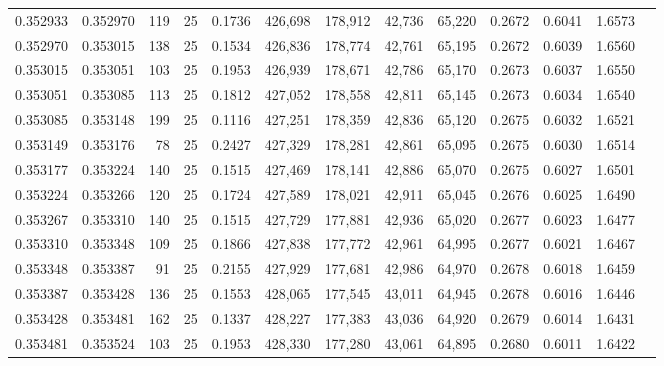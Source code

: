\begin{tabular}{rrrrrrrrrrrrr}
0.352933 & 0.352970 &   119 &  25 &                                     0.1736 & 426,698 & 178,912 &  42,736 &  65,220 & 0.2672 & 0.6041 & 1.6573 \\
0.352970 & 0.353015 &   138 &  25 &                                     0.1534 & 426,836 & 178,774 &  42,761 &  65,195 & 0.2672 & 0.6039 & 1.6560 \\
0.353015 & 0.353051 &   103 &  25 &                                     0.1953 & 426,939 & 178,671 &  42,786 &  65,170 & 0.2673 & 0.6037 & 1.6550 \\
0.353051 & 0.353085 &   113 &  25 &                                     0.1812 & 427,052 & 178,558 &  42,811 &  65,145 & 0.2673 & 0.6034 & 1.6540 \\
0.353085 & 0.353148 &   199 &  25 &                                     0.1116 & 427,251 & 178,359 &  42,836 &  65,120 & 0.2675 & 0.6032 & 1.6521 \\
0.353149 & 0.353176 &    78 &  25 &                                     0.2427 & 427,329 & 178,281 &  42,861 &  65,095 & 0.2675 & 0.6030 & 1.6514 \\
0.353177 & 0.353224 &   140 &  25 &                                     0.1515 & 427,469 & 178,141 &  42,886 &  65,070 & 0.2675 & 0.6027 & 1.6501 \\
0.353224 & 0.353266 &   120 &  25 &                                     0.1724 & 427,589 & 178,021 &  42,911 &  65,045 & 0.2676 & 0.6025 & 1.6490 \\
0.353267 & 0.353310 &   140 &  25 &                                     0.1515 & 427,729 & 177,881 &  42,936 &  65,020 & 0.2677 & 0.6023 & 1.6477 \\
0.353310 & 0.353348 &   109 &  25 &                                     0.1866 & 427,838 & 177,772 &  42,961 &  64,995 & 0.2677 & 0.6021 & 1.6467 \\
0.353348 & 0.353387 &    91 &  25 &                                     0.2155 & 427,929 & 177,681 &  42,986 &  64,970 & 0.2678 & 0.6018 & 1.6459 \\
0.353387 & 0.353428 &   136 &  25 &                                     0.1553 & 428,065 & 177,545 &  43,011 &  64,945 & 0.2678 & 0.6016 & 1.6446 \\
0.353428 & 0.353481 &   162 &  25 &                                     0.1337 & 428,227 & 177,383 &  43,036 &  64,920 & 0.2679 & 0.6014 & 1.6431 \\
0.353481 & 0.353524 &   103 &  25 &                                     0.1953 & 428,330 & 177,280 &  43,061 &  64,895 & 0.2680 & 0.6011 & 1.6422 \\

\end{tabular}
